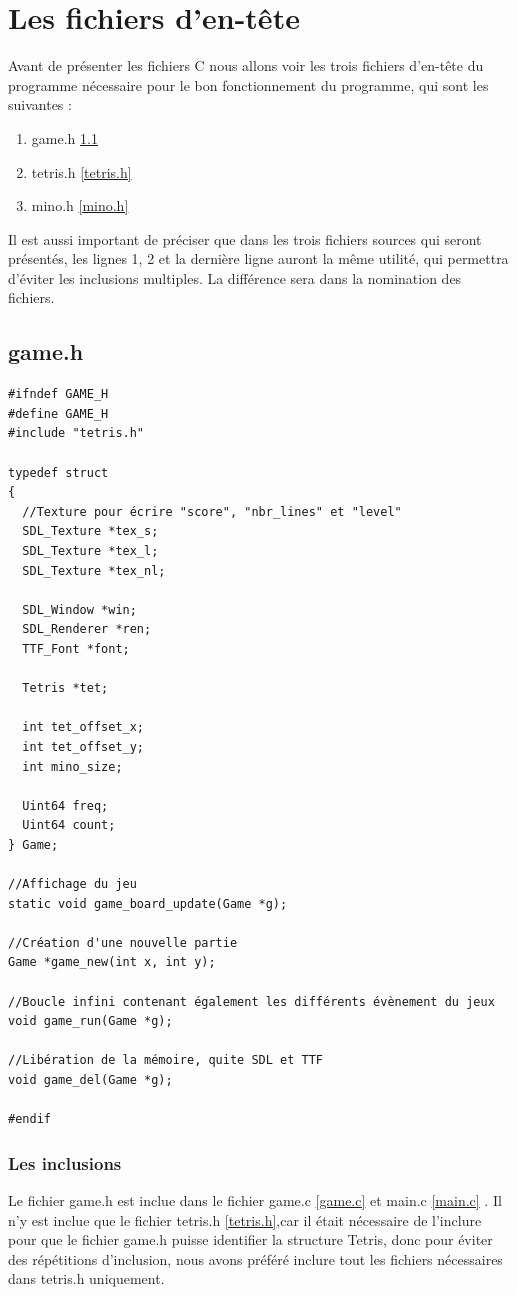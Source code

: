 \documentclass[a4paper,10p]{report}
\begin{document}
\newpage
\chapter{Les fichiers d'en-tête}
Avant de présenter les fichiers C nous allons voir les trois fichiers d'en-tête du programme nécessaire pour le bon fonctionnement du programme, qui sont les suivantes : \begin{enumerate}
    \item game.h \ref{game.h}
    \item tetris.h \ref{tetris.h} 
    \item mino.h \ref{mino.h}
    \end{enumerate}
Il est aussi important de préciser que dans les trois fichiers sources qui seront présentés, les lignes \textcolor{gris}{1}, \textcolor{gris}{2} et la dernière ligne auront la même utilité, qui permettra d'éviter les inclusions multiples. La différence sera dans la nomination des fichiers.
\section{game.h}
\label{game.h}
\begin{lstlisting}
#ifndef GAME_H
#define GAME_H
#include "tetris.h"

typedef struct
{
  //Texture pour écrire "score", "nbr_lines" et "level"
  SDL_Texture *tex_s;
  SDL_Texture *tex_l;
  SDL_Texture *tex_nl;
  
  SDL_Window *win;
  SDL_Renderer *ren;
  TTF_Font *font;
  
  Tetris *tet;
  
  int tet_offset_x;
  int tet_offset_y;
  int mino_size;
  
  Uint64 freq;
  Uint64 count;
} Game;

//Affichage du jeu
static void game_board_update(Game *g);

//Création d'une nouvelle partie
Game *game_new(int x, int y);

//Boucle infini contenant également les différents évènement du jeux
void game_run(Game *g);

//Libération de la mémoire, quite SDL et TTF
void game_del(Game *g);

#endif
\end{lstlisting}
\subsection{Les inclusions}
Le fichier game.h est inclue dans le fichier game.c \ref{game.c} et main.c \ref{main.c} . Il n'y est inclue que le fichier tetris.h \ref{tetris.h},car il était nécessaire de l'inclure pour que le fichier game.h puisse identifier la structure Tetris, donc pour éviter des répétitions d'inclusion, nous avons préféré inclure tout les fichiers nécessaires dans tetris.h uniquement.
\end{document}

